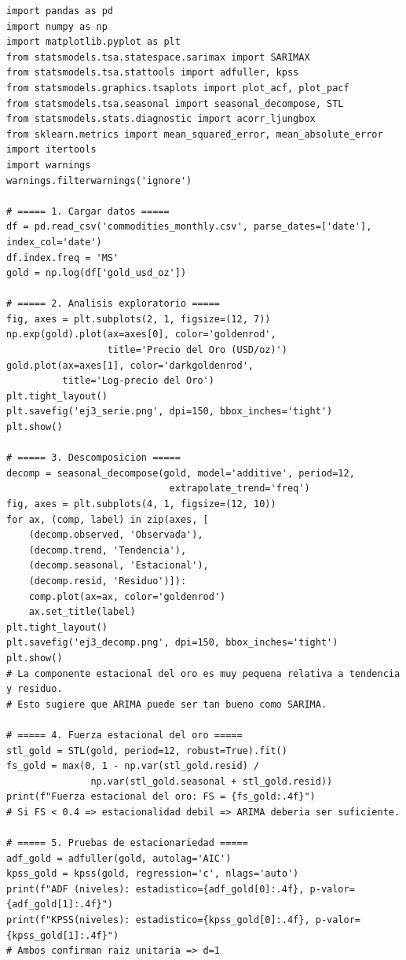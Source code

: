 \documentclass[12pt,a4paper]{article}
\theoremstyle{definition}
\begin{document}
\begin{lstlisting}[style=python, caption={Ejemplo 3: Comparacion ARIMA vs.\ SARIMA - Oro}]
import pandas as pd
import numpy as np
import matplotlib.pyplot as plt
from statsmodels.tsa.statespace.sarimax import SARIMAX
from statsmodels.tsa.stattools import adfuller, kpss
from statsmodels.graphics.tsaplots import plot_acf, plot_pacf
from statsmodels.tsa.seasonal import seasonal_decompose, STL
from statsmodels.stats.diagnostic import acorr_ljungbox
from sklearn.metrics import mean_squared_error, mean_absolute_error
import itertools
import warnings
warnings.filterwarnings('ignore')

# ===== 1. Cargar datos =====
df = pd.read_csv('commodities_monthly.csv', parse_dates=['date'], index_col='date')
df.index.freq = 'MS'
gold = np.log(df['gold_usd_oz'])

# ===== 2. Analisis exploratorio =====
fig, axes = plt.subplots(2, 1, figsize=(12, 7))
np.exp(gold).plot(ax=axes[0], color='goldenrod',
                  title='Precio del Oro (USD/oz)')
gold.plot(ax=axes[1], color='darkgoldenrod',
          title='Log-precio del Oro')
plt.tight_layout()
plt.savefig('ej3_serie.png', dpi=150, bbox_inches='tight')
plt.show()

# ===== 3. Descomposicion =====
decomp = seasonal_decompose(gold, model='additive', period=12,
                             extrapolate_trend='freq')
fig, axes = plt.subplots(4, 1, figsize=(12, 10))
for ax, (comp, label) in zip(axes, [
    (decomp.observed, 'Observada'),
    (decomp.trend, 'Tendencia'),
    (decomp.seasonal, 'Estacional'),
    (decomp.resid, 'Residuo')]):
    comp.plot(ax=ax, color='goldenrod')
    ax.set_title(label)
plt.tight_layout()
plt.savefig('ej3_decomp.png', dpi=150, bbox_inches='tight')
plt.show()
# La componente estacional del oro es muy pequena relativa a tendencia y residuo.
# Esto sugiere que ARIMA puede ser tan bueno como SARIMA.

# ===== 4. Fuerza estacional del oro =====
stl_gold = STL(gold, period=12, robust=True).fit()
fs_gold = max(0, 1 - np.var(stl_gold.resid) /
               np.var(stl_gold.seasonal + stl_gold.resid))
print(f"Fuerza estacional del oro: FS = {fs_gold:.4f}")
# Si FS < 0.4 => estacionalidad debil => ARIMA deberia ser suficiente.

# ===== 5. Pruebas de estacionariedad =====
adf_gold = adfuller(gold, autolag='AIC')
kpss_gold = kpss(gold, regression='c', nlags='auto')
print(f"ADF (niveles): estadistico={adf_gold[0]:.4f}, p-valor={adf_gold[1]:.4f}")
print(f"KPSS(niveles): estadistico={kpss_gold[0]:.4f}, p-valor={kpss_gold[1]:.4f}")
# Ambos confirman raiz unitaria => d=1


\end{lstlisting}
\end{document}
